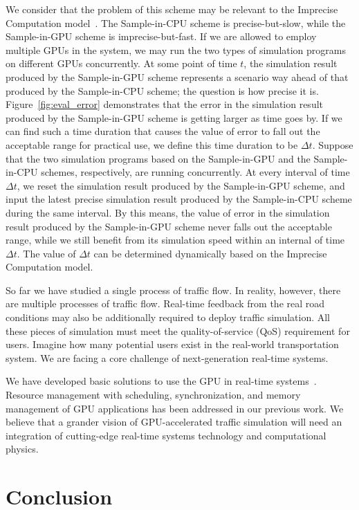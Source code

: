 \documentclass[times, 10pt, twocolumn]{article}
\begin{document}
We consider that the problem of this scheme may be relevant to the
Imprecise Computation model~\cite{Lin1987}.
The Sample-in-CPU scheme is precise-but-slow, while the Sample-in-GPU
scheme is imprecise-but-fast.
If we are allowed to employ multiple GPUs in the system, we may run the
two types of simulation programs on different GPUs concurrently.
At some point of time $t$, the simulation result produced by the
Sample-in-GPU scheme represents a scenario way ahead of that produced by
the Sample-in-CPU scheme; the question is how precise it is.
Figure~\ref{fig:eval_error} demonstrates that the error in the
simulation result produced by the Sample-in-GPU scheme is getting larger
as time goes by.
If we can find such a time duration that causes the value of error to
fall out the acceptable range for practical use, we define this time
duration to be $\Delta t$.
Suppose that the two simulation programs based on the Sample-in-GPU and
the Sample-in-CPU schemes, respectively, are running concurrently.
At every interval of time $\Delta t$, we reset the simulation result
produced by the Sample-in-GPU scheme, and input the latest precise
simulation result produced by the Sample-in-CPU scheme during the same
interval.
By this means, the value of error in the simulation result produced by
the Sample-in-GPU scheme never falls out the acceptable range, while we
still benefit from its simulation speed within an internal of time
$\Delta t$.
The value of $\Delta t$ can be determined dynamically based on the
Imprecise Computation model.

So far we have studied a single process of traffic flow.
In reality, however, there are multiple processes of traffic flow.
Real-time feedback from the real road conditions may also be
additionally required to deploy traffic simulation.
All these pieces of simulation must meet the quality-of-service (QoS)
requirement for users.
Imagine how many potential users exist in the real-world transportation
system.
We are facing a core challenge of next-generation real-time systems.

We have developed basic solutions to use the GPU in real-time
systems~\cite{Kato2011_3, Kato2011_2, Kato2011_1, Kato2012}.
Resource management with scheduling, synchronization, and memory
management of GPU applications has been addressed in our previous
work.
We believe that a grander vision of GPU-accelerated traffic
simulation will need an integration of cutting-edge real-time systems
technology and computational physics.


\section{Conclusion}
\label{sec:conclusion}
\end{document}
